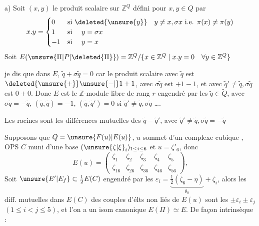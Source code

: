 a) Soit $(x,y)$ le produit scalaire sur $\mathbb Z^Q$ défini pour $x,y\in Q$ par
\[
x.y=\begin{cases}0&\text{si }\deleted{\unsure{y}}\quad y\ne x,\sigma x\ \text{i.e. }\pi(x)\ne\pi(y)\\
1&\text{si }\quad y=\sigma x\\
-1&\text{si }\quad y=x\end{cases}
\]
Soit $E(\unsure{\Pi|P|\deleted{\Pi}})=\mathbb Z^Q/\{x\in\mathbb Z^Q\mid x.y=0\quad\forall y\in\mathbb Z^Q\}$

  je dis que dans $E$, $\tilde q+\sigma\tilde q=0$  car le produit scalaire  avec $\tilde q$ est $\deleted{\unsure{+}}\unsure{-|{}}1+1$, avec $\sigma\tilde q$ est $+1-1$, et avec  $\tilde q'\ne\tilde q,\sigma\tilde q$ est $0+0$. Donc $E$ est le $\mathbb Z$-module libre de rang $r$ engendré par les $\tilde q\in\widetilde Q$, avec $\sigma\tilde q=-\tilde q$, $(\tilde q,\tilde q)=-1$, $(\tilde q,\tilde q')=0$ si $\tilde q'\ne\tilde q,\sigma\tilde q$ \ldots.

Les racines sont les différences mutuelles des $\tilde q-\tilde q'$, avec $\tilde q'\ne\tilde q,\sigma\tilde q=-\tilde q$

Supposons que $Q=\unsure{F(u)|E(u)}$, $u$ sommet d'un complexe cubique , OPS $C$ muni d'une base $(\unsure{\zeta|\xi}_i)_{1\le i\le6}$ et  $u=\zeta'_6$, donc
\[
E(u)=\begin{pmatrix}\zeta_1&\zeta_2&\zeta_3&\zeta_4&\zeta_5\\\zeta_{16}&\zeta_{26}&\zeta_{36}&\zeta_{46}&\zeta_{56}\end{pmatrix},
\]
 Soit $\unsure{E'|E_f}\subset\frac12 E(C)$ engendré par les  $\varepsilon_i=\underbrace{\frac12(\zeta_6-\eta)}_{\theta_0}+\zeta_i$, alors les diff. mutuelles dans $\widehat E(C)$ des couples d'élts non liés de $E(u)$ sont les
$\pm\varepsilon_i\pm\varepsilon_j$ $(1\le i<j\le5)$, et l'on a un isom canonique $E(\Pi)\simeq E$. De façon intrinsèque :

